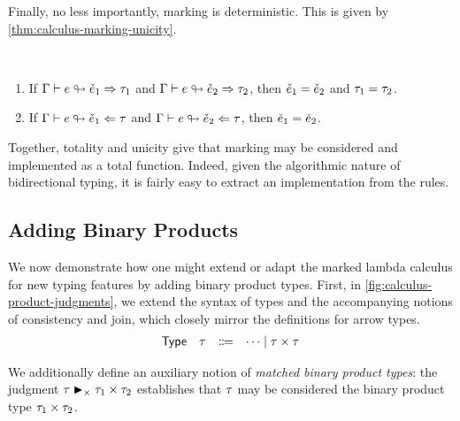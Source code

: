 Finally, no less importantly, marking is deterministic. This is given by
\cref{thm:calculus-marking-unicity}.
%
\begin{theorem}[name=Marking Unicity] \
  \label{thm:calculus-marking-unicity}
  \begin{enumerate}
    \item If $\Gamma \vdash e \looparrowright \check{e}_1 \Rightarrow \tau_1$ and
      $\Gamma \vdash e \looparrowright \check{e}_2 \Rightarrow \tau_2$, then $\check{e}_1 = \check{e}_2$ and $\tau_1 =
      \tau_2$.
    \item If $\Gamma \vdash e \looparrowright \check{e}_1 \Leftarrow \tau$ and
      $\Gamma \vdash e \looparrowright \check{e}_2 \Leftarrow \tau$, then $\check{e}_1 = \check{e}_2$.
  \end{enumerate}
\end{theorem}
%
Together, totality and unicity give that marking may be considered and implemented as a total
function. Indeed, given the algorithmic nature of bidirectional typing, it is fairly easy to extract
an implementation from the rules.

\subsection{Adding Binary Products}
\label{sec:calculus-products}

We now demonstrate how one might extend or adapt the marked lambda calculus for new typing features
by adding binary product types. First, in \cref{fig:calculus-product-judgments}, we extend the
syntax of types and the accompanying notions of consistency and join, which closely mirror the
definitions for arrow types.
%
\[\begin{array}{rrcl}
  {\normalfont\textsf{Type}}  & \tau  & \Coloneqq & \cdots \mid \tau \times \tau
\end{array}\]

We additionally define an auxiliary notion of \emph{matched binary product types}: the judgment
$\tau \blacktriangleright_{\times} \tau_1 \times \tau_2$ establishes that $\tau$ may be considered the binary product
type $\tau_1 \times \tau_2$.

